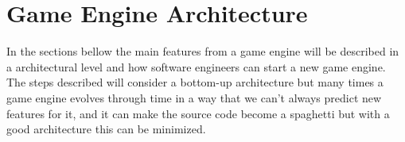 \section{Game Engine Architecture}\label{sec:game-egnine-architecture}
In the sections bellow the main features from a game engine will be described in a architectural level and how software engineers can start a new game engine. The steps described will consider a bottom-up architecture but many times a game engine evolves through time in a way that we can't always predict new features for it, and it can make the source code become a spaghetti but with a good architecture this can be minimized\cite{TheCaseForResearchInGameEngineArchitecture, GameEngineArchitecture}.









%
